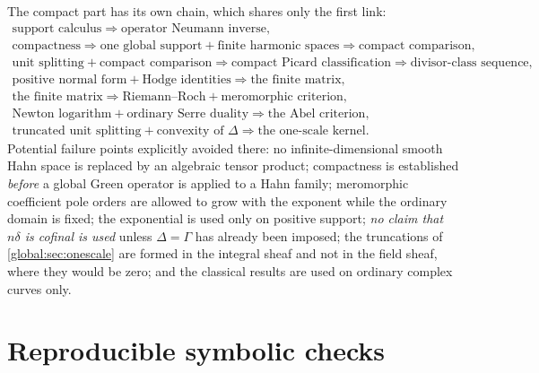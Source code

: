 \documentclass[11pt,letterpaper]{article}
\theoremstyle{definition}
\theoremstyle{remark}
\numberwithin{equation}{section}
\begin{document}
The compact part has its own chain, which shares only the first link:
\[
  \begin{gathered}
  \text{support calculus}\Longrightarrow\text{operator Neumann inverse},\\
  \text{compactness}\Longrightarrow\text{one global support}+\text{finite harmonic spaces}
  \Longrightarrow\text{compact comparison},\\
  \text{unit splitting}+\text{compact comparison}\Longrightarrow
  \text{compact Picard classification}\Longrightarrow\text{divisor-class sequence},\\
  \text{positive normal form}+\text{Hodge identities}
  \Longrightarrow\text{the finite matrix},\\
  \text{the finite matrix}\Longrightarrow
  \text{Riemann--Roch}+\text{meromorphic criterion},\\
  \text{Newton logarithm}+\text{ordinary Serre duality}\Longrightarrow
  \text{the Abel criterion},\\
  \text{truncated unit splitting}+\text{convexity of }\Delta
  \Longrightarrow\text{the one-scale kernel}.
  \end{gathered}
\]
Potential failure points explicitly avoided there: no infinite-dimensional smooth Hahn space is replaced by an algebraic tensor product; compactness is established \emph{before} a global Green operator is applied to a Hahn family; meromorphic coefficient pole orders are allowed to grow with the exponent while the ordinary domain is fixed; the exponential is used only on positive support; \emph{no claim that $n\delta$ is cofinal is used} unless $\Delta=\Gamma$ has already been imposed; the truncations of \cref{global:sec:onescale} are formed in the integral sheaf and not in the field sheaf, where they would be zero; and the classical results are used on ordinary complex curves only.

\section{Reproducible symbolic checks}\label{global:app:checks}
\end{document}
